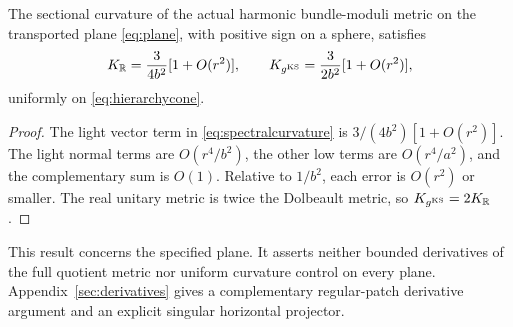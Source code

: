 \begin{proposition}\label{prop:uniformcurvature}
The sectional curvature of the actual harmonic bundle-moduli metric on the transported plane
\eqref{eq:plane}, with positive sign on a sphere, satisfies
\begin{equation}\label{eq:uniformcurvature}
 K_{\mathbb R}=\frac3{4b^2}[1+O(r^2)],\qquad
 K_{g^{\mathrm{KS}}}=\frac3{2b^2}[1+O(r^2)],
\end{equation}
uniformly on \eqref{eq:hierarchycone}.
\end{proposition}
\begin{proof}
The light vector term in \eqref{eq:spectralcurvature} is
$3/(4b^2)[1+O(r^2)]$. The light normal terms are $O(r^4/b^2)$,
the other low terms are $O(r^4/a^2)$, and the complementary sum is
$O(1)$. Relative to $1/b^2$, each error is $O(r^2)$ or smaller.
The real unitary metric is twice the Dolbeault metric, so
$K_{g^{\mathrm{KS}}}=2K_{\mathbb R}$.
\end{proof}

This result concerns the specified plane. It asserts neither bounded
derivatives of the full quotient metric nor uniform curvature control
on every plane. Appendix~\ref{sec:derivatives} gives a complementary
regular-patch derivative argument and an explicit singular horizontal
projector.
